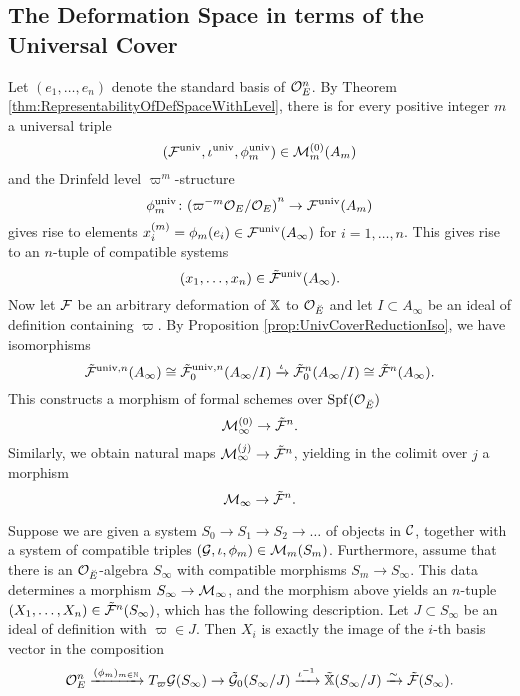 \documentclass[../main.tex]{subfiles}
\begin{document}
\subsection{The Deformation Space in terms of the Universal Cover} %
\label{ssub:Relation to the Deformation Space at Infinite Level}
Let $(e_1, \dots, e_n)$ denote the standard basis of $\mathcal{O}_E^n$. By 
Theorem \ref{thm:RepresentabilityOfDefSpaceWithLevel}, there is for 
every positive integer $m$ a universal triple 
$$(\mathcal{F}^{\mathrm{univ}}, \iota^{{\mathrm{univ}}}, \phi^{\mathrm{univ}}_m) \in \mathcal{M}_{m}^{(0)}(A_m)$$
and the Drinfeld level $\varpi^m$-structure 
\begin{equation*}
  \phi_m^{\mathrm{univ}}\colon {(\varpi^{-m}\mathcal{O}_{E}/\mathcal{O}_E)}^n \to \mathcal{F}^{\mathrm{univ}}(A_m)
\end{equation*}
gives rise to elements $x_i^{(m)} = \phi_m(e_i) \in
\mathcal{F}^{{\mathrm{univ}}}(A_\infty)$ for $i = 1, \dots, n$. 
This gives rise to an $n$-tuple 
of compatible systems
\begin{equation*}
  (x_1, \dots, x_n) \in \tilde {\mathcal{F}}^{\mathrm{univ}} (A_\infty). 
\end{equation*}
Now let $\mathcal{F}$ be an arbitrary deformation of $\mathbb{X}$ to $\mathcal{O}_{{\breve {E}}}$ and let $I \subset A_\infty$ be an ideal of definition
containing $\varpi$. By 
Proposition \ref{prop:UnivCoverReductionIso}, we have isomorphisms
\begin{equation*}
  \tilde {\mathcal{F}}^{{\mathrm{univ}},n}(A_\infty) \cong \tilde {\mathcal{F}}_0^{{\mathrm{univ}}, n}(A_\infty/I)
  \xrightarrow{\iota} \tilde {\mathcal{F}}_0^n(A_\infty/I)
  \cong \tilde {\mathcal{F}}^n(A_\infty).
\end{equation*}
This constructs a morphism of formal schemes over $\operatorname{Spf}(\mathcal{O}_{\breve {E}})$
\begin{equation*} 
  \mathcal{M}_\infty^{(0)} \to \tilde {\mathcal{F}}^n.
\end{equation*}
Similarly, we obtain natural maps $\mathcal{M}_\infty^{(j)} \to \tilde {\mathcal{F}}^n$, yielding in the colimit over $j$ a morphism
\begin{equation}\label{eq:MapFromMtoTildeF}
\mathcal{M}_\infty \to \tilde {\mathcal{F}}^n.
\end{equation}

Suppose we are given a system $S_0 \to S_1 \to S_2 \to \dots$ of objects in 
$\mathcal{C}$, together with a system of compatible triples 
$(\mathcal{G}, \iota, \phi_m) \in \mathcal{M}_m(S_m)$. Furthermore, assume that there
is an $\mathcal{O}_{\breve {E}}$-algebra 
$S_\infty$ with compatible morphisms $S_m \to S_\infty$. This data determines a 
morphism $S_\infty \to \mathcal{M}_\infty$, and the morphism above yields an $n$-tuple 
$(X_1, \dots, X_n) \in \tilde {\mathcal{F}}^n(S_\infty)$, which has the following description. Let $J \subset S_\infty$
be an ideal of definition with $\varpi \in J$. Then $X_i$ is exactly the image
of the $i$-th basis vector in the composition
\begin{equation*}
    {\mathcal{O}_E^n} \xrightarrow{(\phi_m)_{m \in \mathbb{N}}} T_\varpi \mathcal{G}(S_\infty) \to \tilde {\mathcal{G}}_0(S_\infty/J) \xrightarrow{\iota^{-1}} \tilde {\mathbb{X}}(S_\infty/J)
    \xrightarrow{\sim} \tilde {\mathcal{F}}(S_\infty).
\end{equation*}
\end{document}
